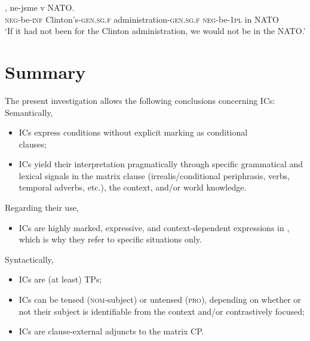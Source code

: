 \documentclass[output=paper,colorlinks,citecolor=brown,newtxmath]{langsci/langscibook}
\begin{document}
\ea\label{ex:weltwissen}
, ne-jsme v NATO. \\
	{} \textsc{neg}-be-\textsc{inf} Clinton's-\textsc{gen.sg.f} administration-\textsc{gen.sg.f} \textsc{neg}-be-\textsc{1pl} in NATO \\
\glt `If it had not been for the Clinton administration, we would not be in the NATO.' \hfill \citep[;][5]{Milotova2012}
\z


\section{Summary}\label{sec:summary}

The present investigation allows the following conclusions concerning  ICs:\\

Semantically,
\begin{itemize}
	\item ICs express conditions without explicit marking as conditional\\ clauses;
	\item ICs yield their interpretation pragmatically through specific grammatical and lexical signals in the matrix clause (irrealis/conditional periphrasis,  verbs, temporal adverbs, etc.), the context, and/or world knowledge.
\end{itemize}

Regarding their use,
\begin{itemize}
	\item ICs are highly marked, expressive, and context-dependent expressions in , which is why they refer to specific situations only.
\end{itemize}

Syntactically,
\begin{itemize}
	\item ICs are (at least) TPs;
	\item ICs can be tensed (\textsc{nom}-subject) or untensed (\textsc{pro}), depending on whether or not their subject is identifiable from the context and/or contrastively focused;
	\item ICs are clause-external adjuncts to the matrix CP.
\end{itemize}
\end{document}
